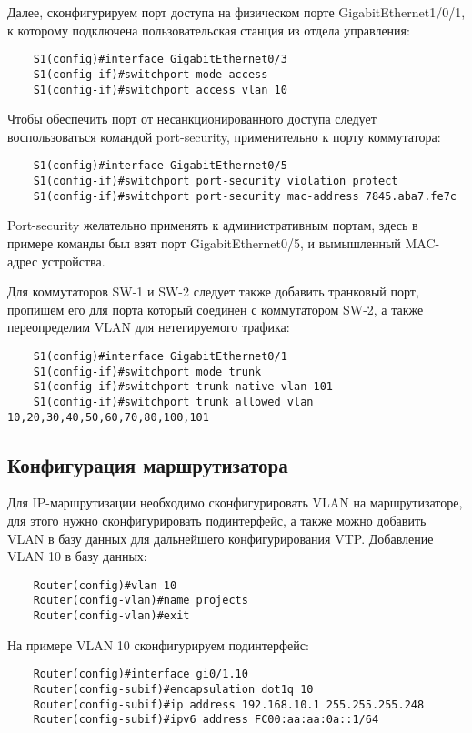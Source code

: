 Далее, сконфигурируем порт доступа на физическом порте GigabitEthernet1/0/1, к которому подключена пользовательская
станция из отдела управления:

\begin{lstlisting}
    S1(config)#interface GigabitEthernet0/3
    S1(config-if)#switchport mode access
    S1(config-if)#switchport access vlan 10
\end{lstlisting}

Чтобы обеспечить порт от несанкционированного доступа следует воспользоваться командой port-security, применительно к порту коммутатора:       
\begin{lstlisting}
    S1(config)#interface GigabitEthernet0/5
    S1(config-if)#switchport port-security violation protect
    S1(config-if)#switchport port-security mac-address 7845.aba7.fe7c
\end{lstlisting}

Port-security желательно применять к административным портам, здесь в примере команды был взят порт GigabitEthernet0/5,
и вымышленный MAC-адрес устройства. 

Для коммутаторов SW-1 и SW-2 следует также добавить транковый порт, пропишем его для порта который соединен с коммутатором SW-2,
а также переопределим VLAN для нетегируемого трафика:

\begin{lstlisting}
    S1(config)#interface GigabitEthernet0/1
    S1(config-if)#switchport mode trunk
    S1(config-if)#switchport trunk native vlan 101
    S1(config-if)#switchport trunk allowed vlan 10,20,30,40,50,60,70,80,100,101
\end{lstlisting}

\subsection{Конфигурация маршрутизатора}

Для IP-маршрутизации необходимо сконфигурировать VLAN на маршрутизаторе, для этого нужно сконфигурировать
подинтерфейс, а также можно добавить VLAN в базу данных для дальнейшего конфигурирования VTP.
Добавление VLAN 10 в базу данных:
\begin{lstlisting}
    Router(config)#vlan 10
    Router(config-vlan)#name projects
    Router(config-vlan)#exit
\end{lstlisting}

На примере VLAN 10 сконфигурируем подинтерфейс:

\begin{lstlisting}
    Router(config)#interface gi0/1.10
    Router(config-subif)#encapsulation dot1q 10
    Router(config-subif)#ip address 192.168.10.1 255.255.255.248
    Router(config-subif)#ipv6 address FC00:aa:aa:0a::1/64
\end{lstlisting}

